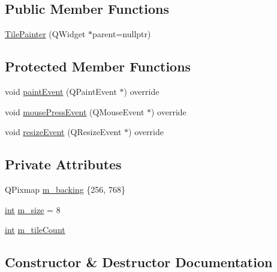 \subsection*{Public Member Functions}
\begin{DoxyCompactItemize}
\item 
\mbox{\hyperlink{class_q_g_b_a_1_1_tile_painter_af6df5c955b23780aa7d330505d89ba1e}{Tile\+Painter}} (Q\+Widget $\ast$parent=nullptr)
\end{DoxyCompactItemize}
\subsection*{Protected Member Functions}
\begin{DoxyCompactItemize}
\item 
void \mbox{\hyperlink{class_q_g_b_a_1_1_tile_painter_a9a08558b55b33d441d09b53d3c91c473}{paint\+Event}} (Q\+Paint\+Event $\ast$) override
\item 
void \mbox{\hyperlink{class_q_g_b_a_1_1_tile_painter_a4ba56bba1679a154a5074160ceffe9c0}{mouse\+Press\+Event}} (Q\+Mouse\+Event $\ast$) override
\item 
void \mbox{\hyperlink{class_q_g_b_a_1_1_tile_painter_a0f83eae376a1319ddee3303431381651}{resize\+Event}} (Q\+Resize\+Event $\ast$) override
\end{DoxyCompactItemize}
\subsection*{Private Attributes}
\begin{DoxyCompactItemize}
\item 
Q\+Pixmap \mbox{\hyperlink{class_q_g_b_a_1_1_tile_painter_a9df39b2be251272063e851ec3893d676}{m\+\_\+backing}} \{256, 768\}
\item 
\mbox{\hyperlink{ioapi_8h_a787fa3cf048117ba7123753c1e74fcd6}{int}} \mbox{\hyperlink{class_q_g_b_a_1_1_tile_painter_a3997d804e4ddfbff0b362c3c7e0146f8}{m\+\_\+size}} = 8
\item 
\mbox{\hyperlink{ioapi_8h_a787fa3cf048117ba7123753c1e74fcd6}{int}} \mbox{\hyperlink{class_q_g_b_a_1_1_tile_painter_a59a17a4d1cf1cc1ba3e4db33d2dc19e9}{m\+\_\+tile\+Count}}
\end{DoxyCompactItemize}


\subsection{Constructor \& Destructor Documentation}
\mbox{\label{class_q_g_b_a_1_1_tile_painter_af6df5c955b23780aa7d330505d89ba1e}} 
